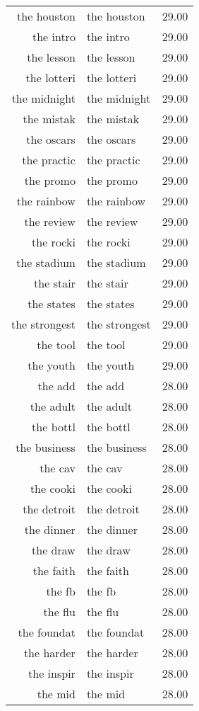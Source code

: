 \begin{table}[ht]
\begin{tabular}{rlr}
  the houston & the houston & 29.00 \\ 
  the intro & the intro & 29.00 \\ 
  the lesson & the lesson & 29.00 \\ 
  the lotteri & the lotteri & 29.00 \\ 
  the midnight & the midnight & 29.00 \\ 
  the mistak & the mistak & 29.00 \\ 
  the oscars & the oscars & 29.00 \\ 
  the practic & the practic & 29.00 \\ 
  the promo & the promo & 29.00 \\ 
  the rainbow & the rainbow & 29.00 \\ 
  the review & the review & 29.00 \\ 
  the rocki & the rocki & 29.00 \\ 
  the stadium & the stadium & 29.00 \\ 
  the stair & the stair & 29.00 \\ 
  the states & the states & 29.00 \\ 
  the strongest & the strongest & 29.00 \\ 
  the tool & the tool & 29.00 \\ 
  the youth & the youth & 29.00 \\ 
  the add & the add & 28.00 \\ 
  the adult & the adult & 28.00 \\ 
  the bottl & the bottl & 28.00 \\ 
  the business & the business & 28.00 \\ 
  the cav & the cav & 28.00 \\ 
  the cooki & the cooki & 28.00 \\ 
  the detroit & the detroit & 28.00 \\ 
  the dinner & the dinner & 28.00 \\ 
  the draw & the draw & 28.00 \\ 
  the faith & the faith & 28.00 \\ 
  the fb & the fb & 28.00 \\ 
  the flu & the flu & 28.00 \\ 
  the foundat & the foundat & 28.00 \\ 
  the harder & the harder & 28.00 \\ 
  the inspir & the inspir & 28.00 \\ 
  the mid & the mid & 28.00 \\ 

\end{tabular}
\end{table}

